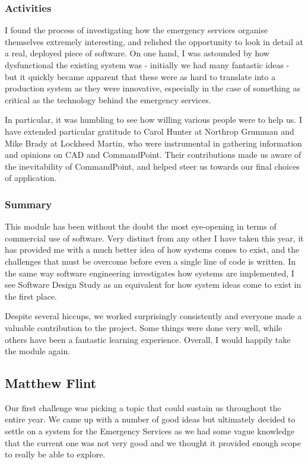 \documentclass[]{article}
\begin{document}
    \subsubsection*{Activities}

    I found the process of investigating how the emergency services organise themselves extremely interesting, and relished the opportunity to look in detail at a real, deployed piece of software. On one hand, I was astounded by how dysfunctional the existing system was - initially we had many fantastic ideas - but it quickly became apparent that these were as hard to translate into a production system as they were innovative, especially in the case of something as critical as the technology behind the emergency services.

    In particular, it was humbling to see how willing various people were to help us. I have extended particular gratitude to Carol Hunter at Northrop Grumman and Mike Brady at Lockheed Martin, who were instrumental in gathering information and opinions on CAD and CommandPoint. Their contributions made us aware of the inevitability of CommandPoint, and helped steer us towards our final choices of application.

    \subsubsection*{Summary}

    This module has been without the doubt the most eye-opening in terms of commercial use of software. Very distinct from any other I have taken this year, it has provided me with a much better idea of how systems comes to exist, and the challenges that must be overcome before even a single line of code is written. In the same way software engineering investigates how systems are implemented, I see Software Design Study as an equivalent for how system ideas come to exist in the first place.

    Despite several hiccups, we worked surprisingly consistently and everyone made a valuable contribution to the project. Some things were done very well, while others have been a fantastic learning experience. Overall, I would happily take the module again.

    \pagebreak
    \subsection{Matthew Flint}
    Our first challenge was picking a topic that could sustain us throughout the entire year. We came up with a number of good ideas but ultimately decided to settle on a system for the Emergency Services as we had some vague knowledge that the current one was not very good and we thought it provided enough scope to really be able to explore.\\
\end{document}
